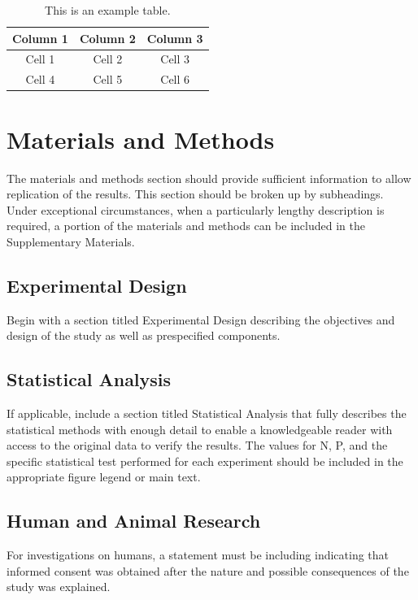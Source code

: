 \documentclass{article}
\begin{document}
\begin{table}[b]
    \caption{This is an example table.}    
    \centering
    \begin{tabular}{ccc}
            \hline
            Column 1 & Column 2 & Column 3 \\  
            \hline
            Cell 1 & Cell 2 & Cell 3\\ 
            Cell 4 & Cell 5 & Cell 6 \\
            \hline
            \end{tabular}

    \label{tab:1}
\end{table}

\section{Materials and Methods}
The materials and methods section should provide sufficient information to allow replication of the results. 
This section should be broken up by subheadings. Under exceptional circumstances, when a particularly lengthy 
description is required, a portion of the materials and methods can be included in the Supplementary Materials. 

\subsection{Experimental Design}
Begin with a section titled Experimental Design describing the objectives and design of the study as well as 
prespecified components. 

\subsection{Statistical Analysis}
If applicable, include a section titled Statistical Analysis that fully describes the statistical methods with 
enough detail to enable a knowledgeable reader with access to the original data to verify the results. The values 
for N, P, and the specific statistical test performed for each experiment should be included in the appropriate 
figure legend or main text. 

\subsection{Human and Animal Research}
For investigations on humans, a statement must be including indicating that informed consent was obtained after 
the nature and possible consequences of the study was explained.
\end{document}
